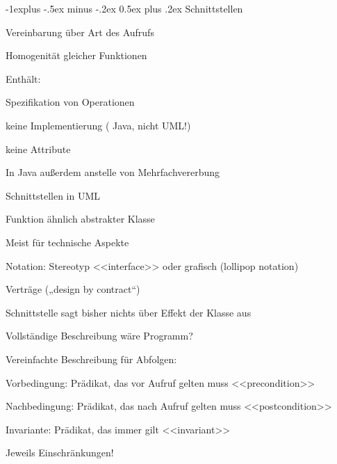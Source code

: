 \documentclass[a4paper]{article}
\makeatletter
\renewcommand{\subsection}{\@startsection{subsection}{2}{0mm}%
                                {-1explus -.5ex minus -.2ex}%
                                {0.5ex plus .2ex}%
                                {\normalfont\normalsize\bfseries}}
\makeatother
\begin{document}
\begin{multicols}{3}
  \subsection{Schnittstellen}
  \begin{itemize*}
    \item Vereinbarung über Art des Aufrufs
          \begin{itemize*}
            \item Homogenität gleicher Funktionen
            \item Enthält:
            \item Spezifikation von Operationen
            \item keine Implementierung ( Java, nicht UML!)
            \item keine Attribute
            \item In Java außerdem anstelle von Mehrfachvererbung
          \end{itemize*}
    \item Schnittstellen in UML
          \begin{itemize*}
            \item Funktion ähnlich abstrakter Klasse
            \item Meist für technische Aspekte
            \item Notation: Stereotyp <<interface>> oder grafisch (lollipop notation)
          \end{itemize*}
    \item Verträge („design by contract“)
          \begin{itemize*}
            \item Schnittstelle sagt bisher nichts über Effekt der Klasse aus
            \item Vollständige Beschreibung wäre Programm?
            \item Vereinfachte Beschreibung für Abfolgen:
            \item Vorbedingung: Prädikat, das vor Aufruf gelten muss <<precondition>>
            \item Nachbedingung: Prädikat, das nach Aufruf gelten muss <<postcondition>>
            \item Invariante: Prädikat, das immer gilt <<invariant>>
            \item Jeweils Einschränkungen!
          \end{itemize*}
  \end{itemize*}


\end{multicols}
\end{document}
